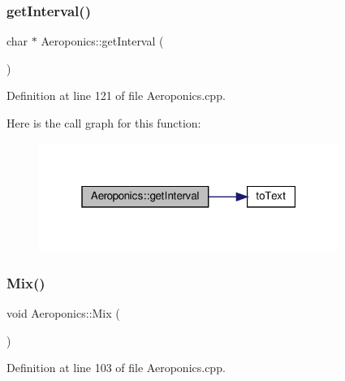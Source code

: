 \subsubsection{\texorpdfstring{get\+Interval()}{getInterval()}\hspace{0.1cm}{\footnotesize\ttfamily [2/2]}}
{\footnotesize\ttfamily char $\ast$ Aeroponics\+::get\+Interval (\begin{DoxyParamCaption}{ }\end{DoxyParamCaption})}



Definition at line 121 of file Aeroponics.\+cpp.

Here is the call graph for this function\+:
\nopagebreak
\begin{figure}[H]
\begin{center}
\leavevmode
\includegraphics[width=277pt]{class_aeroponics_af5c051ee5e24b10644d70d5e5a2b82b7_cgraph}
\end{center}
\end{figure}
\mbox{\label{class_aeroponics_a509f52009146d740a519154b5beca6ff}} 
\subsubsection{\texorpdfstring{Mix()}{Mix()}\hspace{0.1cm}{\footnotesize\ttfamily [1/2]}}
{\footnotesize\ttfamily void Aeroponics\+::\+Mix (\begin{DoxyParamCaption}{ }\end{DoxyParamCaption})\hspace{0.3cm}{\ttfamily [protected]}}



Definition at line 103 of file Aeroponics.\+cpp.

